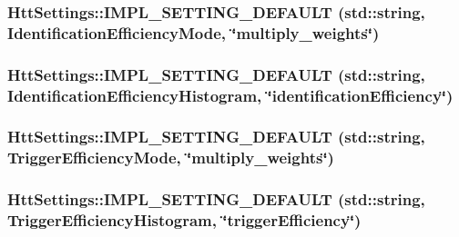 \hypertarget{classHttSettings_ab8748bfbd6132d3e7acd14c95bf86fe6}{
\subsubsection[{IMPL\_\-SETTING\_\-DEFAULT}]{\setlength{\rightskip}{0pt plus 5cm}HttSettings::IMPL\_\-SETTING\_\-DEFAULT (std::string, \/  IdentificationEfficiencyMode, \/  \char`\"{}multiply\_\-weights\char`\"{})}}
\label{classHttSettings_ab8748bfbd6132d3e7acd14c95bf86fe6}
\hypertarget{classHttSettings_adf2bac074503f040e82618fc2345a5fc}{
\subsubsection[{IMPL\_\-SETTING\_\-DEFAULT}]{\setlength{\rightskip}{0pt plus 5cm}HttSettings::IMPL\_\-SETTING\_\-DEFAULT (std::string, \/  IdentificationEfficiencyHistogram, \/  \char`\"{}identificationEfficiency\char`\"{})}}
\label{classHttSettings_adf2bac074503f040e82618fc2345a5fc}
\hypertarget{classHttSettings_a1574630abf1ab2d0197f91e7296db55f}{
\subsubsection[{IMPL\_\-SETTING\_\-DEFAULT}]{\setlength{\rightskip}{0pt plus 5cm}HttSettings::IMPL\_\-SETTING\_\-DEFAULT (std::string, \/  TriggerEfficiencyMode, \/  \char`\"{}multiply\_\-weights\char`\"{})}}
\label{classHttSettings_a1574630abf1ab2d0197f91e7296db55f}
\hypertarget{classHttSettings_aaacf2d8bb898b43bed3d12c702e7a2b1}{
\subsubsection[{IMPL\_\-SETTING\_\-DEFAULT}]{\setlength{\rightskip}{0pt plus 5cm}HttSettings::IMPL\_\-SETTING\_\-DEFAULT (std::string, \/  TriggerEfficiencyHistogram, \/  \char`\"{}triggerEfficiency\char`\"{})}}
